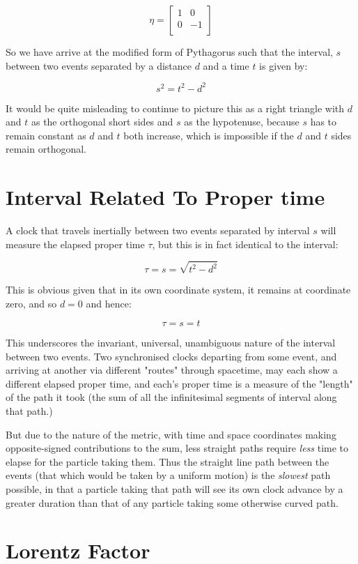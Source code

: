 $$
\eta =
\begin{bmatrix}
1 & 0 \\
0 & -1 \\
\end{bmatrix}
$$

So we have arrive at the modified form of Pythagorus such that the interval, $s$ between two events separated by a distance $d$ and a time $t$ is given by:

$$s^2 = t^2 - d^2$$

It would be quite misleading to continue to picture this as a right triangle with $d$ and $t$ as the orthogonal short sides and $s$ as the hypotenuse, because $s$ has to remain constant as $d$ and $t$ both increase, which is impossible if the $d$ and $t$ sides remain orthogonal.

\section{Interval Related To Proper time}

A clock that travels inertially between two events separated by interval $s$ will measure the elapsed proper time $\tau$, but this is in fact identical to the interval:

$$\tau = s = \sqrt{t^2 - d^2}$$

This is obvious given that in its own coordinate system, it remains at coordinate zero, and so $d = 0$ and hence:

$$\tau = s = t$$

This underscores the invariant, universal, unambiguous nature of the interval between two events. Two synchronised clocks departing from some event, and arriving at another via different "routes" through spacetime, may each show a different elapsed proper time, and each's proper time is a measure of the "length" of the path it took (the sum of all the infinitesimal segments of interval along that path.)

But due to the nature of the metric, with time and space coordinates making opposite-signed contributions to the sum, less straight paths require \textit{less} time to elapse for the particle taking them. Thus the straight line path between the events (that which would be taken by a uniform motion) is the \textit{slowest} path possible, in that a particle taking that path will see its own clock advance by a greater duration than that of any particle taking some otherwise curved path.

\section{Lorentz Factor}

